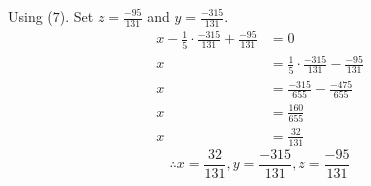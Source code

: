 Using ($7$). Set $z = \frac{-95}{131}$ and $y = \frac{-315}{131}$.
\begin{align*}
    x - \frac{1}{5} \cdot \frac{-315}{131} + \frac{-95}{131} &= 0 \\
    x &=  \frac{1}{5} \cdot \frac{-315}{131} - \frac{-95}{131}  \\
    x &=  \frac{-315}{655} - \frac{-475}{655}  \\
    x &=  \frac{160}{655}  \\
    x &=  \frac{32}{131}
\end{align*}
\[\therefore x = \frac{32}{131}, y = \frac{-315}{131}, z = \frac{-95}{131} \]